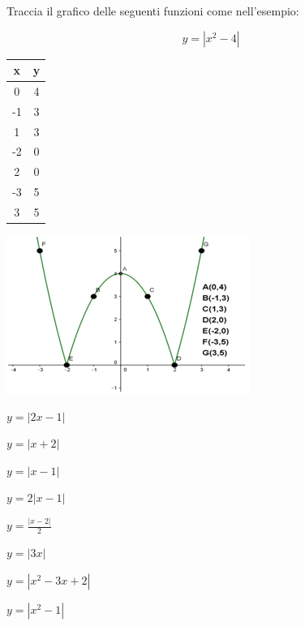 \begin{esercizio}\label{ese:03.1}
Traccia il grafico delle seguenti funzioni come nell'esempio:

\noindent\begin{minipage}{.40\textwidth}
$$y=|x^2-4|$$
\begin{tabular}{|c|c|}
        \hline
        x & y \\
        \hline
        0 & 4 \\
        \hline  
        -1 & 3 \\
        \hline
        1 & 3 \\
        \hline
        -2 & 0 \\
        \hline
        2 & 0 \\
        \hline
        -3 & 5 \\
        \hline
        3 & 5 \\
        \hline                                                  
\end{tabular} 
\end{minipage}
\hfill
\begin{minipage}{.58\textwidth}
\begin{inaccessibleblock}[TODO]
\centering
\includegraphics[width=0.9\linewidth]{img/imm7} %
\end{inaccessibleblock}
\end{minipage}

\begin{multicols}{4}
\begin{enumeratea}
        \item $y=|2x-1|$
        \item $y=|x+2|$
        \item $y=|x-1|$
        \item $y=2|x-1|$
        \item $y=\frac{|x-2|}{2}$
        \item $y=|3x|$
        \item $y=|x^2-3x+2|$
        \item $y=|x^2-1|$
\end{enumeratea}
\end{multicols}
\end{esercizio}

